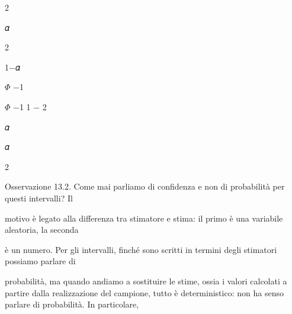 \documentclass[a4paper,portrait,12pt]{article}
\begin{document}
2





\begin{flushleft}
𝛼
\end{flushleft}


2





\begin{flushleft}
1$-$𝛼
\end{flushleft}





\begin{flushleft}
$\Phi$ $-$1
\end{flushleft}





\begin{flushleft}
$\Phi$ $-$1 1 $-$ 2
\end{flushleft}





\begin{flushleft}
𝛼
\end{flushleft}





\begin{flushleft}
𝛼
\end{flushleft}


2





\begin{flushleft}
Osservazione 13.2. Come mai parliamo di confidenza e non di probabilit\`{a} per questi intervalli? Il
\end{flushleft}


\begin{flushleft}
motivo \`{e} legato alla differenza tra stimatore e stima: il primo \`{e} una variabile aleatoria, la seconda
\end{flushleft}


\begin{flushleft}
\`{e} un numero. Per gli intervalli, finch\'{e} sono scritti in termini degli stimatori possiamo parlare di
\end{flushleft}


\begin{flushleft}
probabilit\`{a}, ma quando andiamo a sostituire le stime, ossia i valori calcolati a partire dalla realizzazione del campione, tutto \`{e} deterministico: non ha senso parlare di probabilit\`{a}. In particolare,
\end{flushleft}
\end{document}
